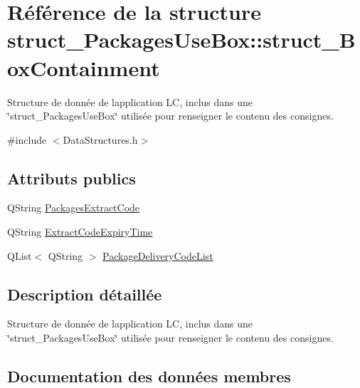 \hypertarget{structstruct___packages_use_box_1_1struct___box_containment}{}\section{Référence de la structure struct\+\_\+\+Packages\+Use\+Box\+:\+:struct\+\_\+\+Box\+Containment}
\label{structstruct___packages_use_box_1_1struct___box_containment}


Structure de donnée de l\textquotesingle{}application L\+C, inclus dans une \char`\"{}struct\+\_\+\+Packages\+Use\+Box\char`\"{} utilisée pour renseigner le contenu des consignes.  




{\ttfamily \#include $<$Data\+Structures.\+h$>$}

\subsection*{Attributs publics}
\begin{DoxyCompactItemize}
\item 
Q\+String \hyperlink{structstruct___packages_use_box_1_1struct___box_containment_a855bb0e314bbf6e36bac0876bc1dd363}{Packages\+Extract\+Code}
\item 
Q\+String \hyperlink{structstruct___packages_use_box_1_1struct___box_containment_a84d48ae9098b43b8a1458a20fd868565}{Extract\+Code\+Expiry\+Time}
\item 
Q\+List$<$ Q\+String $>$ \hyperlink{structstruct___packages_use_box_1_1struct___box_containment_aa0ff418a79d449125b33c794337029f0}{Package\+Delivery\+Code\+List}
\end{DoxyCompactItemize}


\subsection{Description détaillée}
Structure de donnée de l\textquotesingle{}application L\+C, inclus dans une \char`\"{}struct\+\_\+\+Packages\+Use\+Box\char`\"{} utilisée pour renseigner le contenu des consignes. 

\subsection{Documentation des données membres}
\hypertarget{structstruct___packages_use_box_1_1struct___box_containment_a84d48ae9098b43b8a1458a20fd868565}{}
